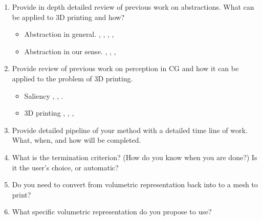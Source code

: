\begin{enumerate}
	\item Provide in depth detailed review of previous work on abstractions. What can be applied to 3D printing and how?
	
	\begin{itemize}
		\item Abstraction in general. \cite{Berger2013}, \cite{DeGoes2011}, \cite{Hildebrand2012}, \cite{McCrae2011}, \cite{Li2010}
		\item Abstraction in our sense. \cite{Echevarria2014}, \cite{Mehra2009}, \cite{Yang2009}, \cite{Yumer2012}
	\end{itemize}

  \item Provide review of previous work on perception in CG and how it can be applied to the problem of 3D printing.
	
	\begin{itemize}
		\item Saliency \cite{Nan2011}, \cite{Wu2013}, \cite{Feixas2009}. \cite{Kim2010}
		\item 3D printing \cite{Echevarria2014}, \cite{Wang2015} \cite{Stava2012}, \cite{Torkhani2015},
	\end{itemize}

  \item Provide detailed pipeline of your method with a detailed time line of work. What, when, and how will be completed.
	
	
	\item What is the termination criterion? (How do you know when you are done?) Is it the user's choice, or automatic?

  \item Do you need to convert from volumetric representation back into to a mesh to print?

  \item What specific volumetric representation do you propose to use?


\end{enumerate}
